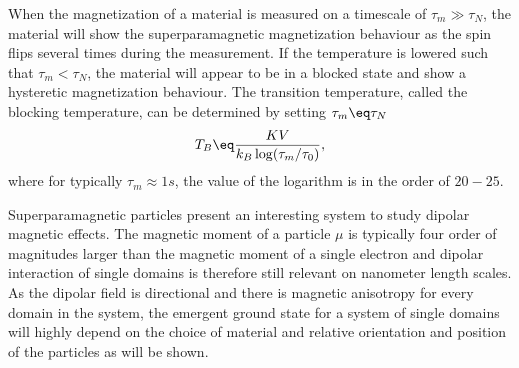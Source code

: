 \documentclass[\main/dresen_thesis.tex]{subfiles}
\begin{document}
    When the magnetization of a material is measured on a timescale of $\tau_m \gg \tau_N$, the material will show the superparamagnetic magnetization behaviour as the spin flips several times during the measurement.
    If the temperature is lowered such that $\tau_m < \tau_N$, the material will appear to be in a blocked state and show a hysteretic magnetization behaviour.
    The transition temperature, called the blocking temperature, can be determined by setting $\tau_m \eq \tau_N$
    \begin{align}
      T_B \eq \frac{KV}{k_B \log(\tau_m/\tau_0)},
    \end{align}
    where for typically $\tau_m \approx 1 \unit{s}$, the value of the logarithm is in the order of $20 - 25$.

    Superparamagnetic particles present an interesting system to study dipolar magnetic effects.
    The magnetic moment of a particle $\mu$ is typically four order of magnitudes larger than the magnetic moment of a single electron and dipolar interaction of single domains is therefore still relevant on nanometer length scales.
    As the dipolar field is directional and there is magnetic anisotropy for every domain in the system, the emergent ground state for a system of single domains will highly depend on the choice of material and relative orientation and position of the particles as will be shown.
\end{document}
